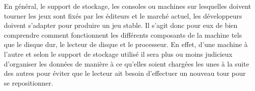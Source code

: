 \documentclass[a4paper, 12pt]{article} %
\begin{document}
En général, le support de stockage, les consoles ou machines sur lesquelles doivent tourner les jeux sont fixés par les éditeurs et le marché actuel, les développeurs doivent s'adapter pour produire un jeu stable. Il s'agit donc pour eux de bien comprendre comment fonctionnent les différents composants de la machine tels que le disque dur, le lecteur de disque et le processeur. En effet, d'une machine à l'autre et selon le support de stockage utilisé il sera plus ou moins judicieux d'organiser les données de manière à ce qu'elles soient chargées les unes à la suite des autres pour éviter que le lecteur ait besoin d'effectuer un nouveau tour pour se repositionner.

\newpage



\end{document}
